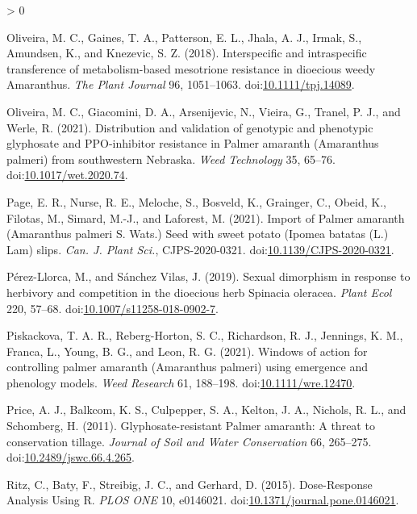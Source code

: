 \documentclass[utf8]{frontiersSCNS}
\newlength{\cslhangindent}
\newenvironment{CSLReferences}[2] %
 {%
  \setlength{\parindent}{0pt}
  \ifodd #1 \everypar{\setlength{\hangindent}{\cslhangindent}}\ignorespaces\fi
  \ifnum #2 > 0
  \setlength{\parskip}{#2\baselineskip}
  \fi
 }%
 {}
\begin{document}
\begin{CSLReferences}{1}{0}
\leavevmode\hypertarget{ref-oliveira2018}{}%
Oliveira, M. C., Gaines, T. A., Patterson, E. L., Jhala, A. J., Irmak,
S., Amundsen, K., and Knezevic, S. Z. (2018). Interspecific and
intraspecific transference of metabolism-based mesotrione resistance in
dioecious weedy {Amaranthus}. \emph{The Plant Journal} 96, 1051--1063.
doi:\href{https://doi.org/10.1111/tpj.14089}{10.1111/tpj.14089}.

\leavevmode\hypertarget{ref-oliveira2021a}{}%
Oliveira, M. C., Giacomini, D. A., Arsenijevic, N., Vieira, G., Tranel,
P. J., and Werle, R. (2021). Distribution and validation of genotypic
and phenotypic glyphosate and {PPO}-inhibitor resistance in {Palmer}
amaranth ({Amaranthus} palmeri) from southwestern {Nebraska}. \emph{Weed
Technology} 35, 65--76.
doi:\href{https://doi.org/10.1017/wet.2020.74}{10.1017/wet.2020.74}.

\leavevmode\hypertarget{ref-page2021}{}%
Page, E. R., Nurse, R. E., Meloche, S., Bosveld, K., Grainger, C.,
Obeid, K., Filotas, M., Simard, M.-J., and Laforest, M. (2021). Import
of {Palmer} amaranth ({Amaranthus} palmeri {S}. {Wats}.) Seed with sweet
potato ({Ipomea} batatas ({L}.) {Lam}) slips. \emph{Can. J. Plant Sci.},
CJPS-2020-0321.
doi:\href{https://doi.org/10.1139/CJPS-2020-0321}{10.1139/CJPS-2020-0321}.

\leavevmode\hypertarget{ref-perez-llorca2019}{}%
Pérez-Llorca, M., and Sánchez Vilas, J. (2019). Sexual dimorphism in
response to herbivory and competition in the dioecious herb {Spinacia}
oleracea. \emph{Plant Ecol} 220, 57--68.
doi:\href{https://doi.org/10.1007/s11258-018-0902-7}{10.1007/s11258-018-0902-7}.

\leavevmode\hypertarget{ref-piskackova2021}{}%
Piskackova, T. A. R., Reberg-Horton, S. C., Richardson, R. J., Jennings,
K. M., Franca, L., Young, B. G., and Leon, R. G. (2021). Windows of
action for controlling palmer amaranth ({Amaranthus} palmeri) using
emergence and phenology models. \emph{Weed Research} 61, 188--198.
doi:\href{https://doi.org/10.1111/wre.12470}{10.1111/wre.12470}.

\leavevmode\hypertarget{ref-price2011}{}%
Price, A. J., Balkcom, K. S., Culpepper, S. A., Kelton, J. A., Nichols,
R. L., and Schomberg, H. (2011). Glyphosate-resistant {Palmer} amaranth:
{A} threat to conservation tillage. \emph{Journal of Soil and Water
Conservation} 66, 265--275.
doi:\href{https://doi.org/10.2489/jswc.66.4.265}{10.2489/jswc.66.4.265}.

\leavevmode\hypertarget{ref-ritz2015}{}%
Ritz, C., Baty, F., Streibig, J. C., and Gerhard, D. (2015).
Dose-{Response Analysis Using R}. \emph{PLOS ONE} 10, e0146021.
doi:\href{https://doi.org/10.1371/journal.pone.0146021}{10.1371/journal.pone.0146021}.


\end{CSLReferences}
\end{document}

